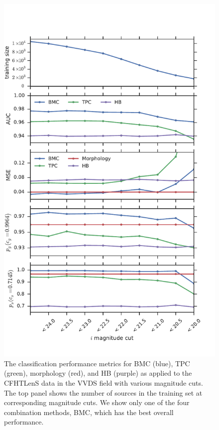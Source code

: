 \begin{figure}[htp]
    \centering
    \includegraphics[width=0.7\linewidth]{figures/perform_mag_cut.pdf}
    \caption{The classification performance metrics for
      BMC (blue), TPC (green), morphology (red), and HB (purple)
      as applied to the CFHTLenS data in the VVDS field
      with various magnitude cuts.
      The top panel shows the number of sources in the training set
      at corresponding magnitude cuts.
      We show only one of the four combination methods, BMC,
      which has the best overall performance.}
    \label{fig:perform_mag_cut}
\end{figure}


